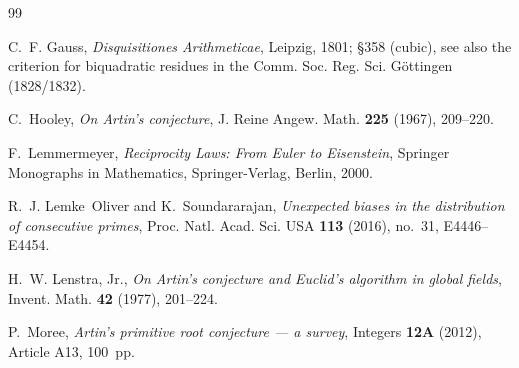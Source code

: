 \documentclass[11pt,reqno]{amsart}
\theoremstyle{plain}
\theoremstyle{definition}
\begin{document}
\begin{thebibliography}{99}

C.~F. Gauss,
\emph{Disquisitiones Arithmeticae},
Leipzig, 1801; \S358 (cubic), see also the criterion for biquadratic residues
in the Comm. Soc. Reg. Sci. G\"ottingen (1828/1832).

C.~Hooley,
\emph{On Artin's conjecture},
J. Reine Angew. Math. \textbf{225} (1967), 209--220.

F.~Lemmermeyer,
\emph{Reciprocity Laws: From Euler to Eisenstein},
Springer Monographs in Mathematics, Springer-Verlag, Berlin, 2000.

R.~J. Lemke~Oliver and K.~Soundararajan,
\emph{Unexpected biases in the distribution of consecutive primes},
Proc. Natl. Acad. Sci. USA \textbf{113} (2016), no.~31, E4446--E4454.

H.~W. Lenstra, Jr.,
\emph{On Artin's conjecture and Euclid's algorithm in global fields},
Invent. Math. \textbf{42} (1977), 201--224.

P.~Moree,
\emph{Artin's primitive root conjecture --- a survey},
Integers \textbf{12A} (2012), Article A13, 100~pp.

\end{thebibliography}
\end{document}
